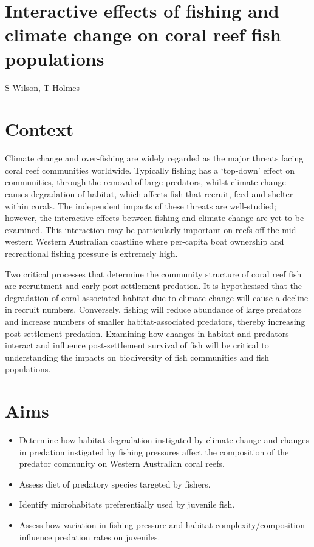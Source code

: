 \documentclass[version=last,
    paper=a4, %
    10pt, %
    usenames,
    dvipsnames,
    oneside, %
    headings=openany, %
    DIV=15 %
]{scrbook}
\begin{document}
\section*{Interactive effects of fishing and climate change on coral reef fish
populations
}

S Wilson, T Holmes


\section*{Context}
Climate change and over-fishing are widely regarded as the major threats
facing coral reef communities worldwide. Typically fishing has a
`top-down' effect on communities, through the removal of large
predators, whilst climate change causes degradation of habitat, which
affects fish that recruit, feed and shelter within corals. The
independent impacts of these threats are well-studied; however, the
interactive effects between fishing and climate change are yet to be
examined. This interaction may be particularly important on reefs off
the mid-western Western Australian coastline where per-capita boat
ownership and recreational fishing pressure is extremely high.

Two critical processes that determine the community structure of coral
reef fish are recruitment and early post-settlement predation. It is
hypothesised that the degradation of coral-associated habitat due to
climate change will cause a decline in recruit numbers. Conversely,
fishing will reduce abundance of large predators and increase numbers of
smaller habitat-associated predators, thereby increasing post-settlement
predation. Examining how changes in habitat and predators interact and
influence post-settlement survival of fish will be critical to
understanding the impacts on biodiversity of fish communities and fish
populations.



\section*{Aims}
\begin{itemize}
\itemsep1pt\parskip0pt
\item
  Determine how habitat degradation instigated by climate change and
  changes in predation instigated by fishing pressures affect the
  composition of the predator community on Western Australian coral
  reefs.
\item
  Assess diet of predatory species targeted by fishers.
\item
  Identify microhabitats preferentially used by juvenile fish.
\item
  Assess how variation in fishing pressure and habitat
  complexity/composition influence predation rates on juveniles.
\end{itemize}
\end{document}
